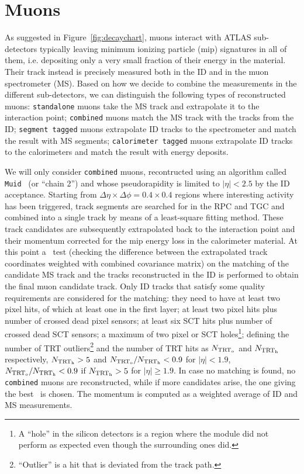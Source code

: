 \section{Muons}\label{sec:muons}

As suggested in Figure~\ref{fig:decaychart}, 
muons interact with ATLAS sub-detectors typically 
leaving minimum ionizing particle (mip) signatures in
all of them, i.e. depositing
only a very small fraction of their energy in the material. 
Their track instead is precisely
measured both in the ID and in the muon spectrometer (MS). 
Based on how we decide to combine
the measurements in the different sub-detectors, we can 
distinguish the following types of reconstructed muons:
\texttt{standalone} muons take the MS track and extrapolate it to the interaction point;
\texttt{combined} muons match the MS track with the tracks from the ID;
\texttt{segment tagged} muons extrapolate ID tracks to the spectrometer and match the result with MS segments;
\texttt{calorimeter tagged} muons extrapolate ID tracks to the calorimeters and match the result with
energy deposits. 

We will only consider \texttt{combined} muons, recontructed using an algorithm 
called \texttt{Muid}~\cite{ATLAS-CONF-2011-063} (or ``chain 2'')
and whose pseudorapidity is limited to $|\eta|<2.5$ by the ID acceptance.
Starting from $\Delta\eta\times\Delta\phi=0.4\times0.4$ regions where interesting activity has been triggered,
track segments are searched for in the RPC and TGC and combined into a single track by means of a
least-square fitting method. These track candidates are 
subsequently extrapolated back to the interaction
point and their momentum corrected for the mip energy loss in the calorimeter material.
At this point a \chisq\ test (checking the difference between the extrapolated track coordinates weighted with
combined covariance matrix) on the matching of the candidate MS track and the tracks reconstructed in 
the ID is performed to obtain the final muon candidate track. Only ID tracks that satisfy some quality 
requirements are considered for the matching: they need to have at least two pixel hits, of which at least
one in the first layer; at least two pixel hits plus number of crossed dead pixel sensors; at least six SCT hits
plus number of  crossed dead SCT sensors; a maximum of two pixel or SCT holes\footnote{A ``hole'' in the silicon
detectors is a region where the module did not perform as expected even though the surrounding ones did.};
defining the number of TRT outliers\footnote{``Outlier'' is a hit that is deviated from the track path.} 
and the number of TRT hits as $N_{\rm TRT_{o}}$ and  $N_{\rm TRT_{h}}$ respectively, 
$N_{\rm TRT_{h}}>5$ and $N_{\rm TRT_{o}}/N_{\rm TRT_{h}}<0.9$ for $|\eta|<1.9$, 
$N_{\rm TRT_{o}}/N_{\rm TRT_{h}}<0.9$ if $N_{\rm TRT_{h}}>5$ for  $|\eta|\geq1.9$.
In case no matching is found, no \texttt{combined} 
muons are reconstructed, while if more candidates arise, the one giving the best \chisq\ is chosen.
The momentum is computed as a weighted average of ID and MS measurements.

